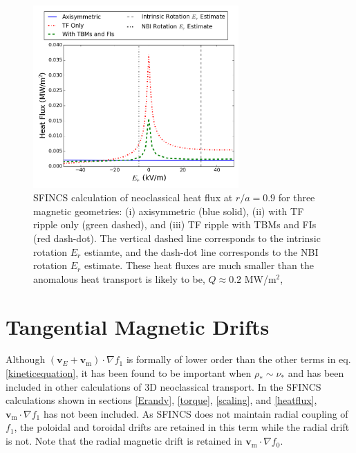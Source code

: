 \documentclass[aip, pop, preprint]{revtex4-1}
\numberwithin{figure}{section}
\numberwithin{equation}{section}
\begin{document}
\begin{figure}[h!]
\centering
\includegraphics[width=0.7\textwidth]
{HeatFlux.png}
\caption{\label{fig:HeatFlux} SFINCS calculation of neoclassical heat flux at $r/a = 0.9$ for three magnetic geometries: (i) axisymmetric (blue solid), (ii) with TF ripple only (green dashed), and (iii) TF ripple with TBMs and FIs (red dash-dot). The vertical dashed line corresponds to the intrinsic rotation $E_r$ estiamte, and the dash-dot line corresponds to the NBI rotation $E_r$ estimate. These heat fluxes are much smaller than the anomalous heat transport is likely to be, $Q\approx 0.2$ MW/m$^2$,}
\end{figure}

\FloatBarrier

\section{Tangential Magnetic Drifts}\label{mds}
Although $(\bm{v}_E + \bm{v}_{\text{m}}) \cdot \nabla f_1$ is formally of lower order than the other terms in eq. \ref{kineticequation}, it has been found to be important when $\rho_* \sim \nu_*$ \cite{Calvo2016, Matsuoka2015} and has been included in other calculations of 3D neoclassical transport. In the SFINCS calculations shown in sections \ref{Erandv}, \ref{torque}, \ref{scaling}, and \ref{heatflux}, $\bm{v}_{\text{m}} \cdot \nabla f_1$ has not been included. As SFINCS does not maintain radial coupling of $f_1$, the poloidal and toroidal drifts are retained in this term while the radial drift is not. Note that the radial magnetic drift is retained in $\bm{v}_{\text{m}} \cdot \nabla f_0$. 
\end{document}
